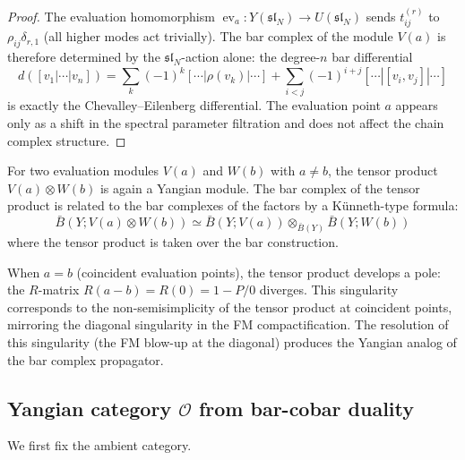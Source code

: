 \begin{proof}
The evaluation homomorphism $\operatorname{ev}_a \colon Y(\mathfrak{sl}_N) \to U(\mathfrak{sl}_N)$
sends $t_{ij}^{(r)}$ to $\rho_{ij} \delta_{r,1}$ (all higher modes act trivially).
The bar complex of the module $V(a)$ is therefore determined by
the $\mathfrak{sl}_N$-action alone: the degree-$n$ bar differential
\[
d([v_1 | \cdots | v_n]) = \sum_{k} (-1)^k [\cdots | \rho(v_k) | \cdots]
+ \sum_{i < j} (-1)^{i+j} [\cdots | [v_i, v_j] | \cdots]
\]
is exactly the Chevalley--Eilenberg differential.  The evaluation
point $a$ appears only as a shift in the spectral parameter filtration
and does not affect the chain complex structure.
\end{proof}

\begin{remark}
\label{rem:tensor-eval}

For two evaluation modules $V(a)$ and $W(b)$ with $a \neq b$,
the tensor product $V(a) \otimes W(b)$ is again a Yangian module.
The bar complex of the tensor product is related to the bar complexes
of the factors by a K\"unneth-type formula:
\[
\bar{B}(Y; V(a) \otimes W(b)) \simeq
\bar{B}(Y; V(a)) \otimes_{\bar{B}(Y)} \bar{B}(Y; W(b))
\]
where the tensor product is taken over the bar construction.

When $a = b$ (coincident evaluation points), the tensor product
develops a pole: the $R$-matrix $R(a-b) = R(0) = 1 - P/0$ diverges.
This singularity corresponds to the non-semisimplicity of the tensor
product at coincident points, mirroring the diagonal singularity
in the FM compactification.  The resolution of this singularity
(the FM blow-up at the diagonal) produces the Yangian analog of
the bar complex propagator.
\end{remark}

\subsection{\texorpdfstring{Yangian category $\mathcal{O}$ from bar-cobar duality}{Yangian category O from bar-cobar duality}}
\label{sec:yangian-category-O}

We first fix the ambient category.

